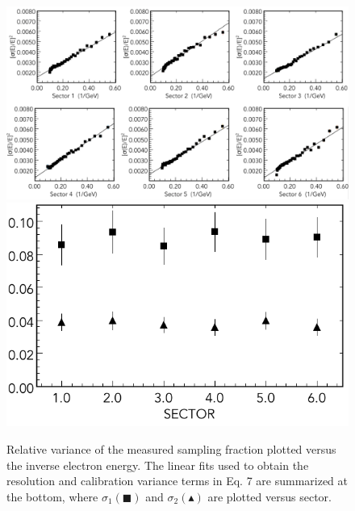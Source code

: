 \begin{figure}[t]
\centering
\includegraphics[width=1.0\columnwidth,keepaspectratio]{img/S10_1_1.png}
\includegraphics[width=0.5\columnwidth,keepaspectratio]{img/S10_1_2.png}
\caption[]{Relative variance of the measured sampling fraction plotted versus the inverse electron energy.  The linear fits used to obtain the resolution and calibration variance terms in Eq. 7 are summarized at the bottom, where $\sigma_1 (\blacksquare)$ and $\sigma_2 (\blacktriangle)$ are plotted versus sector.}
\label{fig:S10_1_1}
\end{figure}


